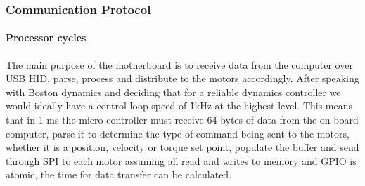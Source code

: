     \subsubsection{Communication Protocol}
   		\paragraph{Processor cycles}
   			The main purpose of the motherboard is to receive data from the computer over USB HID, parse, process and distribute to the motors accordingly. After speaking with Boston dynamics and deciding that for a reliable dynamics controller we would ideally have a control loop speed of \~ 1kHz at the highest level. This means that in 1 ms the micro controller must receive 64 bytes of data from the on board computer, parse it to determine the type of command being sent to the motors, whether it is a position, velocity or torque set point, populate the buffer and send through SPI to each motor assuming all read and writes to memory and GPIO is atomic, the time for data transfer can be calculated. \newline

